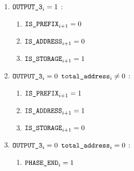 \begin{enumerate}[resume]
\begin{enumerate}[resume]
\begin{enumerate}
					\item \If $\texttt{OUTPUT\_3}_{i} = 1$ \Then:
						\begin{enumerate}
							\item $\texttt{IS\_PREFIX} _{i+1} = 0$
							\item $\texttt{IS\_ADDRESS}   _{i+1} = 0$
							\item $\texttt{IS\_STORAGE}    _{i+1} = 1$
						\end{enumerate}

					\item \If $\texttt{OUTPUT\_3}_{i} = 0$ \et $\texttt{total\_address}_{i} \neq 0$ \Then:
						\begin{enumerate}
							\item $\texttt{IS\_PREFIX} _{i+1} = 1$
							\item $\texttt{IS\_ADDRESS}   _{i+1} = 1$
							\item $\texttt{IS\_STORAGE}    _{i+1} = 0$
						\end{enumerate}

					\item \If $\texttt{OUTPUT\_3}_{i} = 0$ \et $\texttt{total\_address}_{i} = 0$ \Then:
						\begin{enumerate}
							\item $\texttt{PHASE\_END} _{i} = 1$
						\end{enumerate}
				\end{enumerate}			
		\end{enumerate}


\end{enumerate}
